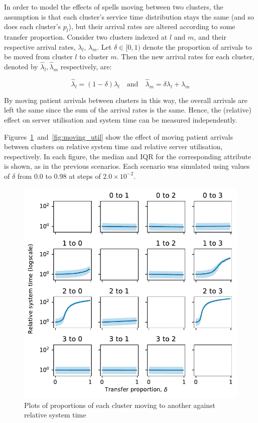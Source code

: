In order to model the effects of spells moving between two clusters, the
assumption is that each cluster's service time distribution stays the same (and
so does each cluster's \(p_l\)), but their arrival rates are altered according
to some transfer proportion. Consider two clusters indexed at \(l\) and \(m\),
and their respective arrival rates, \(\lambda_l\), \(\lambda_m\). Let \(\delta
\in [0, 1)\) denote the proportion of arrivals to be moved from cluster \(l\) to
cluster \(m\). Then the new arrival rates for each cluster, denoted by
\(\hat\lambda_l, \hat\lambda_m\) respectively, are:

\begin{equation}\label{eq:moving}
    \hat\lambda_l = \left(1 - \delta\right) \lambda_l
    \quad \text{and} \quad
    \hat\lambda_m = \delta\lambda_l + \lambda_m
\end{equation}

By moving patient arrivals between clusters in this way, the overall arrivals
are left the same since the sum of the arrival rates is the same. Hence, the
(relative) effect on server utilisation and system time can be measured
independently.

Figures~\ref{fig:moving_time}~and~\ref{fig:moving_util} show the effect of
moving patient arrivals between clusters on relative system time and relative
server utilisation, respectively. In each figure, the median and IQR for the
corresponding attribute is shown, as in the previous scenarios. Each scenario
was simulated using values of \(\delta\) from 0.0 to 0.98 at steps of \(2.0
\times 10^{-2}\).

\begin{figure}
    \centering
    \includegraphics[width=\textwidth]{moving_time}
    \caption{%
        Plots of proportions of each cluster moving to another against relative
        system time
    }\label{fig:moving_time}
\end{figure}

